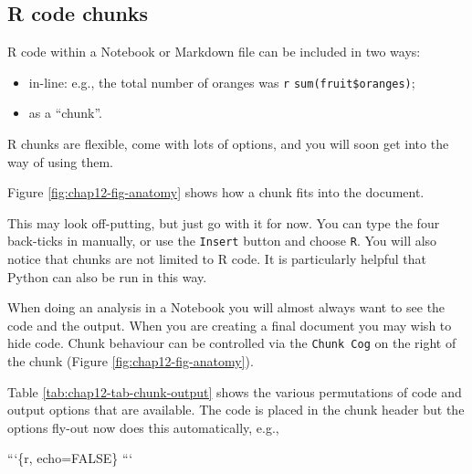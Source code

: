 \documentclass[
  12pt,
  krantz2]{krantz}
\makeatletter
\newenvironment{Shaded}{\begin{snugshade}}{\end{snugshade}}
\newcommand{\BaseNTok}[1]{\textcolor[rgb]{0.00,0.00,0.81}{#1}}
\newcommand{\FunctionTok}[1]{\textcolor[rgb]{0.00,0.00,0.00}{#1}}
\newcommand{\NormalTok}[1]{#1}
\providecommand{\tightlist}{%
  \setlength{\itemsep}{0pt}\setlength{\parskip}{0pt}}
\newenvironment{kframe}{%
\medskip{}
\setlength{\fboxsep}{.8em}
 \def\at@end@of@kframe{}%
 \ifinner\ifhmode%
  \def\at@end@of@kframe{\end{minipage}}%
  \begin{minipage}{\columnwidth}%
 \fi\fi%
 \def\FrameCommand##1{\hskip\@totalleftmargin \hskip-\fboxsep
 \colorbox{shadecolor}{##1}\hskip-\fboxsep
     \hskip-\linewidth \hskip-\@totalleftmargin \hskip\columnwidth}%
 \MakeFramed {\advance\hsize-\width
   \@totalleftmargin\z@ \linewidth\hsize
   \@setminipage}}%
 {\par\unskip\endMakeFramed%
 \at@end@of@kframe}
\renewenvironment{Shaded}{\begin{kframe}}{\end{kframe}}
\makeatother
\begin{document}
\hypertarget{r-code-chunks}{%
\subsection{R code chunks}\label{r-code-chunks}}


R code within a Notebook or Markdown file can be included in two ways:

\begin{itemize}
\tightlist
\item
  in-line: e.g., the total number of oranges was \texttt{\textasciigrave{}r} \texttt{sum(fruit\$oranges)\textasciigrave{}};
\item
  as a ``chunk''.
\end{itemize}

R chunks are flexible, come with lots of options, and you will soon get into the way of using them.

Figure \ref{fig:chap12-fig-anatomy} shows how a chunk fits into the document.

\begin{Shaded}
\end{Shaded}

This may look off-putting, but just go with it for now.
You can type the four back-ticks in manually, or use the \texttt{Insert} button and choose \texttt{R}.
You will also notice that chunks are not limited to R code.
It is particularly helpful that Python can also be run in this way.

When doing an analysis in a Notebook you will almost always want to see the code and the output.
When you are creating a final document you may wish to hide code.
Chunk behaviour can be controlled via the \texttt{Chunk\ Cog} on the right of the chunk (Figure \ref{fig:chap12-fig-anatomy}).

Table \ref{tab:chap12-tab-chunk-output} shows the various permutations of code and output options that are available.
The code is placed in the chunk header but the options fly-out now does this automatically, e.g.,

\begin{Shaded}
\begin{Highlighting}[]
\BaseNTok{```\{r, echo=FALSE\}}
\BaseNTok{```}
\end{Highlighting}
\end{Shaded}
\end{document}

